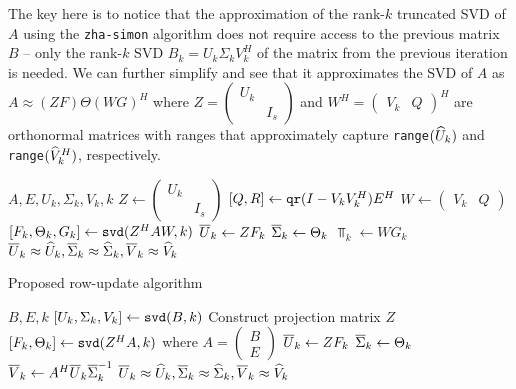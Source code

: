 The key here is to notice that the approximation of the rank-$k$ truncated SVD of $A$ using the \verb+zha-simon+ algorithm does not require access to the previous matrix $B$ -- only the rank-$k$ SVD $B_k=U_k \Sigma_k V_k^H$ of the matrix from the previous iteration is needed.
We can further simplify  and see that it approximates the SVD of $A$ as $A \approx (ZF)\Theta(WG)^H$ where $Z=\begin{pmatrix} U_k & \\ & I_s \end{pmatrix}$ and $W^H=\begin{pmatrix} V_k & Q \end{pmatrix}^H$ are orthonormal matrices with ranges that approximately capture \verb+range+$({\widehat{U}}_k)$ and \verb+range+$({\widehat{V}}_k^H)$, respectively.

\begin{minipage}[t]{0.48\textwidth}
\begin{algorithm}[H]
    \centering
    \cprotect\caption{\verb|zha-simon| algorithm}\label{alg:orig_zha-simon}
    \begin{algorithmic}[1]
      \Require $A,E,U_k,\Sigma_k,V_k,k$
      \State $Z \gets \begin{pmatrix} U_k & \\ & I_s \end{pmatrix}$
      \State $[Q,R] \gets \verb|qr|(I-V_k V_k^H)E^H$ \label{op:zha-simon_qr}
      \State $W \gets \begin{pmatrix} V_k & Q \end{pmatrix}$
      \State $[F_k,\Theta_k,G_k] \gets \verb|svd|(Z^H AW,k)$ \label{op:zha-simon_svd}
      \State ${\overline{U}}_k \gets Z F_k$
      \State ${\overline{\Sigma}}_k \gets \Theta_k$
      \State $\barV_k \gets WG_k$
      \Ensure ${\overline{U}}_k\approx{\widehat{U}}_k,{\overline{\Sigma}}_k\approx{\widehat{\Sigma}}_k,{\overline{V}}_k\approx{\widehat{V}}_k$
    \end{algorithmic}
\end{algorithm}
\end{minipage}
\hfill
\begin{minipage}[t]{0.48\textwidth}
\begin{algorithm}[H]
    \centering
    \caption{Proposed row-update algorithm} \label{alg:row-update}
    \begin{algorithmic}[1]
      \Require $B,E,k$
      \State $[U_k,\Sigma_k,V_k] \gets \verb|svd|(B,k)$
      \State Construct projection matrix $Z$
      \State $[F_k,\Theta_k] \gets \verb|svd|(Z^H A,k)$ where $A=\begin{pmatrix}B\\E\end{pmatrix}$ \label{op:row-update_svd}
      \State ${\overline{U}}_k \gets Z F_k$
      \State ${\overline{\Sigma}}_k \gets \Theta_k$
      \State ${\overline{V}}_k \gets A^H {\overline{U}}_k {\overline{\Sigma}}_k^{-1}$
      \Ensure ${\overline{U}}_k\approx{\widehat{U}}_k,{\overline{\Sigma}}_k\approx{\widehat{\Sigma}}_k,{\overline{V}}_k\approx{\widehat{V}}_k$
    \end{algorithmic}
\end{algorithm}
\end{minipage}

